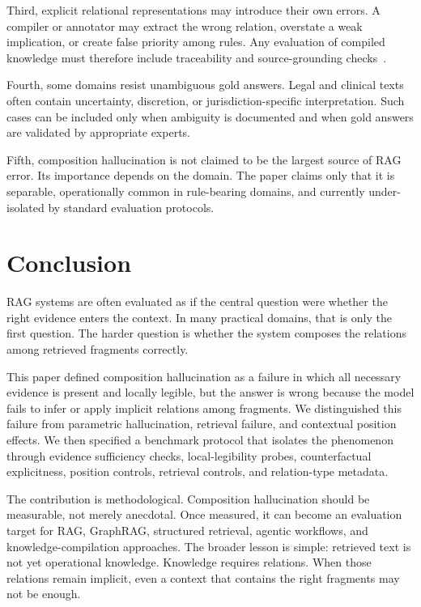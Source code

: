 \documentclass[11pt]{article}
\begin{document}
Third, explicit relational representations may introduce their own errors. A compiler or annotator may extract the wrong relation, overstate a weak implication, or create false priority among rules. Any evaluation of compiled knowledge must therefore include traceability and source-grounding checks~\cite{niu2024ragtruth}.

Fourth, some domains resist unambiguous gold answers. Legal and clinical texts often contain uncertainty, discretion, or jurisdiction-specific interpretation. Such cases can be included only when ambiguity is documented and when gold answers are validated by appropriate experts.

Fifth, composition hallucination is not claimed to be the largest source of RAG error. Its importance depends on the domain. The paper claims only that it is separable, operationally common in rule-bearing domains, and currently under-isolated by standard evaluation protocols.

\section{Conclusion}

RAG systems are often evaluated as if the central question were whether the right evidence enters the context. In many practical domains, that is only the first question. The harder question is whether the system composes the relations among retrieved fragments correctly.

This paper defined composition hallucination as a failure in which all necessary evidence is present and locally legible, but the answer is wrong because the model fails to infer or apply implicit relations among fragments. We distinguished this failure from parametric hallucination, retrieval failure, and contextual position effects. We then specified a benchmark protocol that isolates the phenomenon through evidence sufficiency checks, local-legibility probes, counterfactual explicitness, position controls, retrieval controls, and relation-type metadata.

The contribution is methodological. Composition hallucination should be measurable, not merely anecdotal. Once measured, it can become an evaluation target for RAG, GraphRAG, structured retrieval, agentic workflows, and knowledge-compilation approaches. The broader lesson is simple: retrieved text is not yet operational knowledge. Knowledge requires relations. When those relations remain implicit, even a context that contains the right fragments may not be enough.
\end{document}
